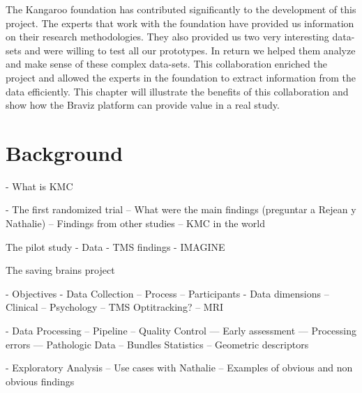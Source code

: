 \label{chap_kmc400}

The Kangaroo foundation has contributed significantly to the development of this project. The experts that work with the foundation have provided us information on their research methodologies. They also provided us two very interesting data-sets and were willing to test all our prototypes. In return we helped them analyze and make sense of these complex data-sets. This collaboration enriched the project and allowed the experts in the foundation to extract information from the data efficiently. This chapter will illustrate the benefits of this collaboration and show how the Braviz platform can provide value in a real study. 

\section{Background}


- What is KMC

- The first randomized trial
-- What were the main findings
(preguntar a Rejean y Nathalie)
-- Findings from other studies
-- KMC in the world


The pilot study
 - Data
 - TMS findings
 - IMAGINE


The saving brains project

 - Objectives
 - Data Collection
 -- Process
 -- Participants
 - Data dimensions
 -- Clinical
 -- Psychology
 -- TMS Optitracking?
 -- MRI
 
 - Data Processing
 -- Pipeline
 -- Quality Control
 --- Early assessment
 --- Processing errors
 --- Pathologic Data
 -- Bundles Statistics
 -- Geometric descriptors

 - Exploratory Analysis
 -- Use cases with Nathalie
 -- Examples of obvious and non obvious findings



